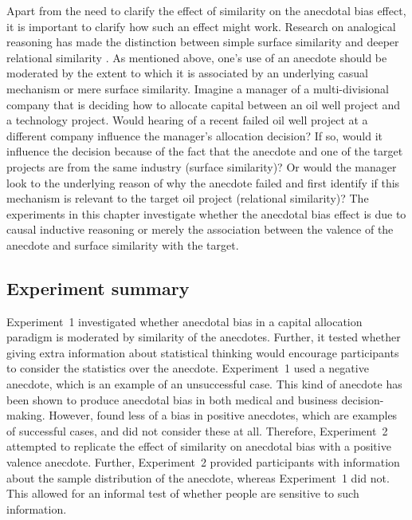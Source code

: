 \documentclass[a4paper, nobind, dvipsnames]{templates/ociamthesis}
\theoremstyle{definition}
\theoremstyle{definition}
\theoremstyle{definition}
\theoremstyle{definition}
\theoremstyle{remark}
\begin{document}
Apart from the need to clarify the effect of similarity on the anecdotal bias
effect, it is important to clarify how such an effect might work. Research on
analogical reasoning has made the distinction between simple surface similarity
and deeper relational similarity \autocite{gentner1983}. As mentioned above, one's use
of an anecdote should be moderated by the extent to which it is associated by an
underlying casual mechanism or mere surface similarity. Imagine a manager of a
multi-divisional company that is deciding how to allocate capital between an oil
well project and a technology project. Would hearing of a recent failed oil well
project at a different company influence the manager's allocation decision? If
so, would it influence the decision because of the fact that the anecdote and
one of the target projects are from the same industry (surface similarity)? Or
would the manager look to the underlying reason of why the anecdote failed and
first identify if this mechanism is relevant to the target oil project
(relational similarity)? The experiments in this chapter investigate whether the
anecdotal bias effect is due to causal inductive reasoning or merely the
association between the valence of the anecdote and surface similarity with the
target.

\subsection{Experiment summary}

Experiment~1 investigated whether anecdotal bias in a capital allocation
paradigm is moderated by similarity of the anecdotes. Further, it tested whether
giving extra information about statistical thinking would encourage participants
to consider the statistics over the anecdote. Experiment~1 used a negative
anecdote, which is an example of an unsuccessful case. This kind of anecdote has
been shown to produce anecdotal bias in both medical \autocite{jaramillo2019} and
business \autocite{wainberg2018} decision-making. However, \textcite{jaramillo2019} found less of
a bias in positive anecdotes, which are examples of successful cases, and
\textcite{wainberg2018} did not consider these at all. Therefore, Experiment~2 attempted
to replicate the effect of similarity on anecdotal bias with a positive valence
anecdote. Further, Experiment~2 provided participants with information about the
sample distribution of the anecdote, whereas Experiment~1 did not. This allowed
for an informal test of whether people are sensitive to such information.
\end{document}

